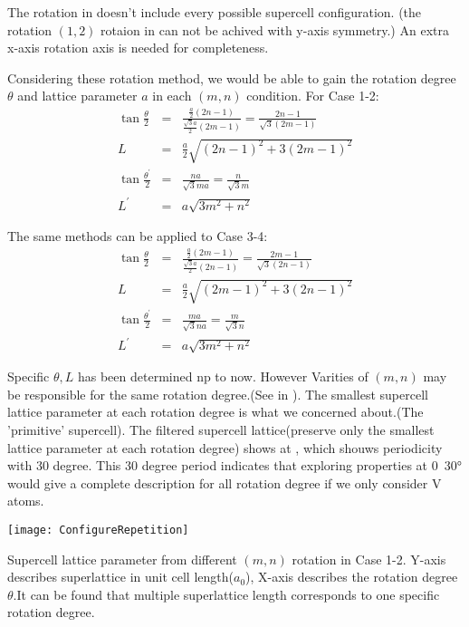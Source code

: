 The rotation in  doesn't include every possible supercell configuration. (\eg the rotation $(1, 2)$ rotaion in  can not be achived with y-axis symmetry.) An extra x-axis rotation axis is needed for completeness.

Considering these rotation method, we would be able to gain the rotation degree $\theta$ and lattice parameter $a$ in each $(m,n)$ condition. For Case 1-2:
\begin{eqnarray}
	\tan \frac{\theta}{2} &=& \frac{\frac{a}{2}(2n - 1)}{\frac{\sqrt{3}a}{2}(2m - 1)} = \frac{2n - 1}{\sqrt{3} (2m - 1)} \label{eqn:thetaCase1} \\
	L &=& \frac{a}{2} \sqrt{(2n - 1)^2 + 3(2m - 1)^2} \label{eqn:lengthCase1}\\
	\tan \frac{\theta^{'}}{2} &=& \frac{na}{\sqrt{3}ma} = \frac{n}{\sqrt{3}m}\label{eqn:thetaCase2} \\
	L^{'} &=& a\sqrt{3m^2 + n^2} \label{eqn:lengthCase2}
\end{eqnarray}

The same methods can be applied to Case 3-4:
\begin{eqnarray}
	\tan \frac{\theta}{2} &=& \frac{\frac{a}{2}(2m - 1)}{\frac{\sqrt{3}a}{2}(2n - 1)} = \frac{2m - 1}{\sqrt{3} (2n - 1)} \label{eqn:thetaCase3} \\
	L &=& \frac{a}{2} \sqrt{(2m - 1)^2 + 3(2n - 1)^2} \label{eqn:lengthCase3}\\
	\tan \frac{\theta^{'}}{2} &=& \frac{ma}{\sqrt{3}na} = \frac{m}{\sqrt{3}n}\label{eqn:thetaCase4} \\
	L^{'} &=& a\sqrt{3m^2 + n^2} \label{eqn:lengthCase4}
\end{eqnarray}

Specific $\theta, L$ has been determined np to now. However Varities of $(m,n)$ may be responsible for the same rotation degree.(See in ). The smallest supercell lattice parameter at each rotation degree is what we concerned about.(\ie The 'primitive' supercell). The filtered supercell lattice(preserve only the smallest lattice parameter at each rotation degree) shows at , which shouws periodicity with 30 degree. This 30 degree period indicates that exploring properties at 0~30° would give a complete description for all rotation degree if we only consider V atoms.

\begin{marginfigure}[]
	\texttt{[image: ConfigureRepetition]}
	\caption[Supercell lattice parameter from different $(m,n)$ rotation in Case 1-2.]{
		Supercell lattice parameter from different $(m,n)$ rotation in Case 1-2. Y-axis describes superlattice in unit cell length($a_0$), X-axis describes the rotation degree $\theta$.It can be found that multiple superlattice length corresponds to one specific rotation degree.
	}
\end{marginfigure}


